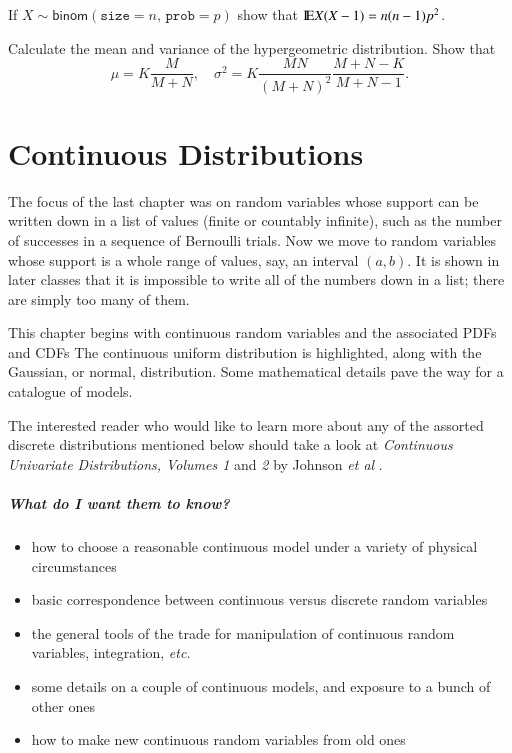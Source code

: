\documentclass[captions=tableheading]{scrbook}
\begin{document}
\begin{xca}
\label{xca:binom-factorial-expectation}
If \(X\sim\mathsf{binom}(\mathtt{size}=n,\,\mathtt{prob}=p)\) show that \(\mathrm{I\hspace{-1.5pt}E} X(X-1)=n(n-1)p^{2}\).
\end{xca}

\begin{xca}
\label{xca:hyper-mean-variance}
Calculate the mean and variance of the hypergeometric distribution. Show that 
\begin{equation}
\mu=K\frac{M}{M+N},\quad\sigma^{2}=K\frac{MN}{(M+N)^{2}}\frac{M+N-K}{M+N-1}.
\end{equation}
\end{xca}
\chapter{Continuous Distributions}
\label{sec-6}

\label{cha:Continuous-Distributions}

\noindent The focus of the last chapter was on random variables whose support can be written down in a list of values (finite or countably infinite), such as the number of successes in a sequence of Bernoulli trials. Now we move to random variables whose support is a whole range of values, say, an interval \((a,b)\). It is shown in later classes that it is impossible to write all of the numbers down in a list; there are simply too many of them.

This chapter begins with continuous random variables and the associated PDFs and CDFs The continuous uniform distribution is highlighted, along with the Gaussian, or normal, distribution. Some mathematical details pave the way for a catalogue of models.

The interested reader who would like to learn more about any of the assorted discrete distributions mentioned below should take a look at \emph{Continuous Univariate Distributions, Volumes 1} and \emph{2} by Johnson \emph{et al} \cite{Johnson1994,Johnson1995}.


\paragraph*{What do I want them to know?}

\begin{itemize}
\item how to choose a reasonable continuous model under a variety of physical circumstances
\item basic correspondence between continuous versus discrete random variables
\item the general tools of the trade for manipulation of continuous random variables, integration, \emph{etc}.
\item some details on a couple of continuous models, and exposure to a bunch of other ones
\item how to make new continuous random variables from old ones
\end{itemize}
\end{document}
